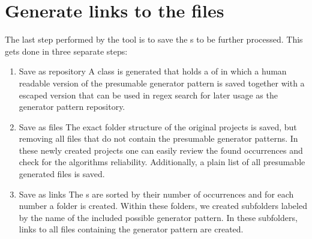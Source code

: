 \section{Generate links to the files}
\label{section:generateLinks}
The last step performed by the tool is to save the s to be further processed. This gets done in three separate steps:
\begin{enumerate}
	\item Save as repository
		\subitem A  class is generated that holds a  of  in which a human readable version of the presumable generator pattern is saved together with a escaped version that can be used in regex search for later usage as the generator pattern repository.
	\item Save as files
		\subitem The exact folder structure of the original projects is saved, but removing all files that do not contain the presumable generator patterns. In these newly created projects one can easily review the found occurrences and check for the algorithms reliability. Additionally, a plain  list of all presumable generated files is saved.
	\item Save as links
		\subitem The s are sorted by their number of occurrences and for each number a folder is created. Within these folders, we created subfolders labeled by the name of the included possible generator pattern. In these subfolders, links to all files containing the generator pattern are created.
\end{enumerate} 

